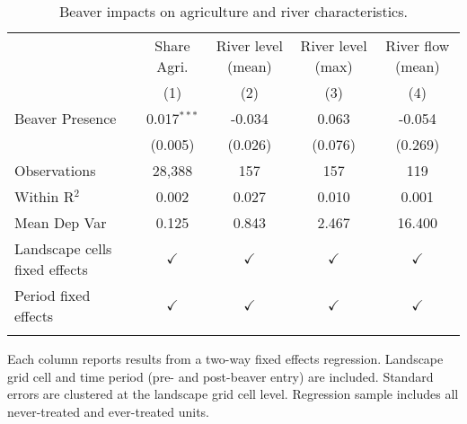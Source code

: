 \begin{table}[htbp]
   \caption{Beaver impacts on agriculture and river characteristics.}
   \centering
   \begin{tabular}{lcccc}
      \tabularnewline\midrule\midrule
                                    & Share Agri.   & River level (mean) & River level (max) & River flow (mean)\\  
                                    & (1)           & (2)                & (3)               & (4)\\  
      \midrule 
      Beaver Presence               & 0.017$^{***}$ & -0.034             & 0.063             & -0.054\\   
                                    & (0.005)       & (0.026)            & (0.076)           & (0.269)\\
      \midrule
      Observations                  & 28,388        & 157                & 157               & 119\\  
      Within R$^2$                  & 0.002         & 0.027              & 0.010             & 0.001\\  
      Mean Dep Var                  & 0.125         & 0.843              & 2.467             & 16.400\\  
       \midrule
      Landscape cells fixed effects & $\checkmark$  & $\checkmark$       & $\checkmark$      & $\checkmark$\\   
      Period fixed effects          & $\checkmark$  & $\checkmark$       & $\checkmark$      & $\checkmark$\\   
      \midrule \midrule & \tabularnewline
   \end{tabular}
   \justifying \footnotesize
   Each column reports results from a two-way fixed effects regression.   Landscape grid cell and time period (pre- and post-beaver entry) are included.   Standard errors are clustered at the landscape grid cell level.   Regression sample includes all never-treated and ever-treated units.
\end{table}
